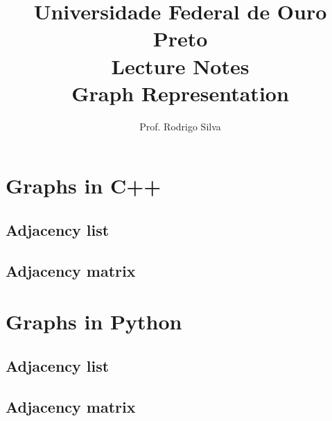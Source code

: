 \documentclass{article}
\title{\vspace{-2 cm}Universidade Federal de Ouro Preto \\ Lecture Notes \\ Graph Representation}
\author{Prof. Rodrigo Silva}
\begin{document}
\maketitle

\section{Graphs in C++}

\subsection{Adjacency list}



\subsection{Adjacency matrix}



\section{Graphs in Python}

\subsection{Adjacency list}



\subsection{Adjacency matrix}


\end{document}

